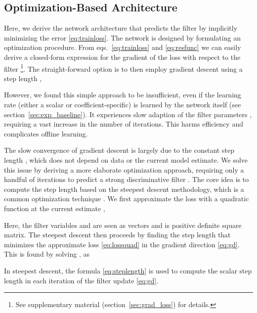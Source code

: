 \documentclass[10pt,twocolumn,letterpaper]{article}
\begin{document}
\subsection{Optimization-Based Architecture}
\label{sec:optim_arch}

Here, we derive the network architecture  that predicts the filter  by implicitly minimizing the error \eqref{eq:trainloss}. The network is designed by formulating an optimization procedure. From eqs.~\eqref{eq:trainloss} and \eqref{eq:resfunc} we can easily derive a closed-form expression for the gradient of the loss  with respect to the filter \footnote{See supplementary material (section~\ref{sec:grad_loss}) for details.}. The straight-forward option is to then employ gradient descent using a step length ,

However, we found this simple approach to be insufficient, even if the learning rate  (either a scalar or coefficient-specific) is learned by the network itself (see section~\ref{sec:exp_baseline}). It experiences slow adaption of the filter parameters , requiring a vast increase in the number of iterations. This harms efficiency and complicates offline learning.

The slow convergence of gradient descent is largely due to the constant step length , which does not depend on data or the current model estimate. We solve this issue by deriving a more elaborate optimization approach, requiring only a handful of iterations to predict a strong discriminative filter . The core idea is to compute the step length  based on the steepest descent methodology, which is a common optimization technique \cite{NumericalOptimization,CGpain}. We first approximate the loss with a quadratic function at the current estimate ,

Here, the filter variables  and  are seen as vectors and  is positive definite square matrix. The steepest descent then proceeds by finding the step length  that minimizes the approximate loss \eqref{eq:lossquad} in the gradient direction \eqref{eq:gd}. This is found by solving , as

In steepest descent, the formula \eqref{eq:steplength} is used to compute the scalar step length  in each iteration of the filter update \eqref{eq:gd}.
\end{document}
